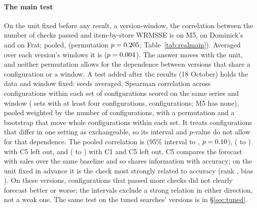 \paragraph{The main test}
On the unit fixed before any result, a version-window, the correlation between
the number of checks passed and item-by-store WRMSSE is \rRhoPassedM{} on M5,
\rRhoPassedD{} on Dominick's and \rRhoPassedF{} on Frat; pooled,
\rRhoPassedPool{} (permutation $p = 0.205$; Table~\ref{tab:realmain}).
Averaged over each version's windows it is \rRhoPassedPoolV{}
($p = 0.004$). The answer moves with the unit, and neither permutation
allows for the dependence between versions that share a configuration or a
window. A test added after the results (18 October) holds the data and window
fixed: seeds averaged, Spearman correlation across configurations within each
set of configurations scored on the same series and window (\rWwData{} sets
with at least four configurations, \rWwConfigs{} configurations; M5 has none),
pooled weighted by the number of configurations, with a permutation and a
bootstrap that move whole configurations within each set. It treats
configurations that differ in one setting as exchangeable, so its interval and
$p$-value do not allow for that dependence. The pooled correlation is
\rWwRho{} (95\% interval \rWwLo{} to \rWwHi, $p = 0.10$), \rWwNoCeRho{}
(\rWwNoCeLo{} to \rWwNoCeHi) with C5 left out, and \rWwNoCaCeRho{}
(\rWwNoCaCeLo{} to \rWwNoCaCeHi) with C1 and C5 left out. C5 compares the
forecast with sales over the same baseline and so shares information with
accuracy; on the unit fixed in advance it is the check most strongly related to
accuracy (rank \rRhoCeRankPool, bias \rRhoCeBiasPool). On these versions,
configurations that passed more checks did not clearly forecast better or
worse; the intervals exclude a strong relation in either direction, not a weak
one. The same test on the tuned searches' versions is in \S\ref{sec:tuned}.

\begin{table}[t]\centering
\caption{\textbf{Earlier audit: across versions, the number of
checks passed was not clearly related to accuracy; the check that was, C5,
shares information with accuracy.} Spearman correlation between each score and
item-by-store WRMSSE (negative: higher scores go with lower error), within each
data set and pooled by permutation within data set (10,000 permutations). Left:
over version-windows, the unit fixed in advance. Right: over versions, the mean
over each version's windows. Both permutations treat their units as
independent. $^\dagger$Added after the results.}\label{tab:realmain}
\footnotesize\setlength{\tabcolsep}{6pt}\end{table}
